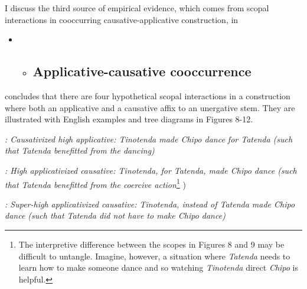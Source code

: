 \documentclass[output=paper,modfonts,nonflat]{langsci/langscibook}
\begin{document}
I discuss the third source of empirical evidence, which comes from scopal interactions in cooccurring causative-applicative construction, in 


\begin{itemize}
\item \begin{itemize}
\item \subsection{Applicative-causative cooccurrence} 
\end{itemize}
\end{itemize}

\citet{Wechsler2016} concludes that there are four hypothetical scopal interactions in a construction where both an applicative and a causative affix to an unergative stem. They are illustrated with English examples and tree diagrams in Figures 8-12. 



  
 



\textit{: Causativized high applicative: Tinotenda made Chipo dance for Tatenda (such that Tatenda benefitted from the dancing)}




 

\textit{: High applicativized causative: Tinotenda, for Tatenda, made Chipo dance (such that Tatenda benefitted from the coercive action}\footnote{The interpretive difference between the scopes in Figures 8 and 9 may be difficult to untangle. Imagine, however, a situation where \textit{Tatenda} needs to learn how to make someone dance and so watching \textit{Tinotenda} direct \textit{Chipo} is helpful.} )



  
 



\textit{: Super-high applicativized causative: Tinotenda, instead of Tatenda made Chipo dance (such that Tatenda did not have to make Chipo dance)}
\end{document}
